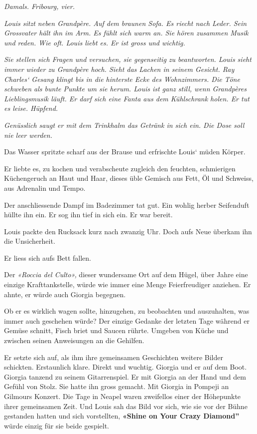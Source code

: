 \emph{Damals. Fribourg, vier.}

\emph{Louis sitzt neben Grandpère. Auf dem braunen Sofa. Es riecht nach
Leder. Sein Grossvater hält ihn im Arm. Es fühlt sich warm an. Sie hören
zusammen Musik und reden. Wie oft. Louis liebt es. Er ist gross und
wichtig.}

\emph{Sie stellen sich Fragen und versuchen, sie gegenseitig zu
beantworten. Louis sieht immer wieder zu Grandpère hoch. Sieht das
Lachen in seinem Gesicht. Ray Charles` Gesang klingt bis in die
hinterste Ecke des Wohnzimmers. Die Töne schweben als bunte Punkte um
sie herum. Louis ist ganz still, wenn Grandpères Lieblingsmusik läuft.
Er darf sich eine Fanta aus dem Kühlschrank holen. Er tut es leise.
Hüpfend.}

\emph{Genüsslich saugt er mit dem Trinkhalm das Getränk in sich ein. Die
Dose soll nie leer werden.}

Das Wasser spritzte scharf aus der Brause und erfrischte Louis` müden
Körper.

Er liebte es, zu kochen und verabscheute zugleich den feuchten,
schmierigen Küchengeruch an Haut und Haar, dieses üble Gemisch aus Fett,
Öl und Schweiss, aus Adrenalin und Tempo.

Der anschliessende Dampf im Badezimmer tat gut. Ein wohlig herber
Seifenduft hüllte ihn ein. Er sog ihn tief in sich ein. Er war bereit.

Louis packte den Rucksack kurz nach zwanzig Uhr. Doch aufs Neue überkam
ihn die Unsicherheit.

Er liess sich aufs Bett fallen.

Der \emph{«Roccia del Culto»,} dieser wundersame Ort auf dem Hügel, über
Jahre eine einzige Krafttankstelle, würde wie immer eine Menge
Feierfreudiger anziehen. Er ahnte, er würde auch Giorgia begegnen.

Ob er es wirklich wagen sollte, hinzugehen, zu beobachten und
auszuhalten, was immer auch geschehen würde? Der einzige Gedanke der
letzten Tage während er Gemüse schnitt, Fisch briet und Saucen rührte.
Umgeben von Küche und zwischen seinen Anweisungen an die Gehilfen.

Er setzte sich auf, als ihm ihre gemeinsamen Geschichten weitere Bilder
schickten. Erstaunlich klare. Direkt und wuchtig. Giorgia und er auf dem
Boot. Giorgia tanzend zu seinem Gitarrenspiel. Er mit Giorgia an der
Hand und dem Gefühl von Stolz. Sie hatte ihn gross gemacht. Mit Giorgia
in Pompeji an Gilmours Konzert. Die Tage in Neapel waren zweifellos
einer der Höhepunkte ihrer gemeinsamen Zeit. Und Louis sah das Bild vor
sich, wie sie vor der Bühne gestanden hatten und sich vorstellten,
\textbf{«Shine on Your Crazy Diamond''} würde einzig für sie beide
gespielt.

